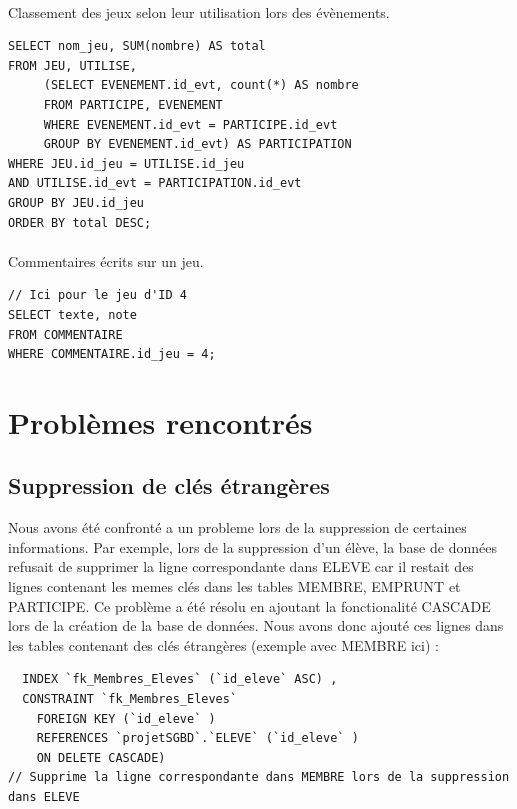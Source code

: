 \documentclass[a4paper, 11pt]{article}
\begin{document}
\paragraph{}
Classement des jeux selon leur utilisation lors des évènements.
\begin{verbatim}
SELECT nom_jeu, SUM(nombre) AS total
FROM JEU, UTILISE, 
     (SELECT EVENEMENT.id_evt, count(*) AS nombre 
     FROM PARTICIPE, EVENEMENT 
     WHERE EVENEMENT.id_evt = PARTICIPE.id_evt 
     GROUP BY EVENEMENT.id_evt) AS PARTICIPATION
WHERE JEU.id_jeu = UTILISE.id_jeu
AND UTILISE.id_evt = PARTICIPATION.id_evt
GROUP BY JEU.id_jeu
ORDER BY total DESC;
\end{verbatim}
\paragraph{}
Commentaires écrits sur un jeu.
\begin{verbatim}
// Ici pour le jeu d'ID 4
SELECT texte, note 
FROM COMMENTAIRE
WHERE COMMENTAIRE.id_jeu = 4;
\end{verbatim}


\section{Problèmes rencontrés}
\subsection{Suppression de clés étrangères}
Nous avons été confronté a un probleme lors de la suppression de certaines informations. Par exemple, lors de la suppression d'un élève, la base de données refusait de supprimer la ligne correspondante dans ELEVE car il restait des lignes contenant les memes clés dans les tables MEMBRE, EMPRUNT et PARTICIPE. Ce problème a été résolu en ajoutant la fonctionalité CASCADE lors de la création de la base de données. Nous avons donc ajouté ces lignes dans les tables contenant des clés étrangères (exemple avec MEMBRE ici) :
\begin{verbatim}
  INDEX `fk_Membres_Eleves` (`id_eleve` ASC) ,
  CONSTRAINT `fk_Membres_Eleves`
    FOREIGN KEY (`id_eleve` )
    REFERENCES `projetSGBD`.`ELEVE` (`id_eleve` )
    ON DELETE CASCADE)  
// Supprime la ligne correspondante dans MEMBRE lors de la suppression dans ELEVE
\end{verbatim}
\end{document}
